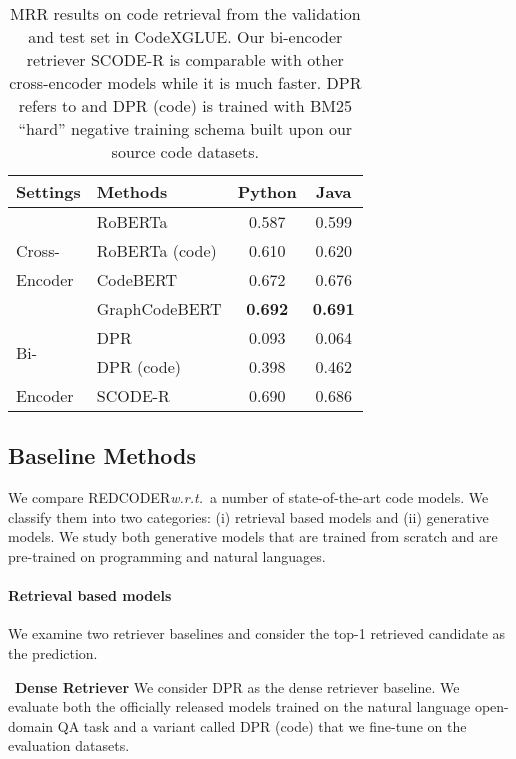 \documentclass[11pt]{article}
\newcommand{\tool}{{REDCODER}\xspace}
\newcommand{\coder}{SCODE-R\xspace}
\newcommand{\wrt}{\textit{w.r.t.}~}
\begin{document}
 \begin{table}[t]
\centering
\begin{tabular}{l|l|c|c}
\hline
Settings & Methods & Python & Java \\
\hline
 & RoBERTa & 0.587	& 0.599 \\
Cross- & RoBERTa (code) & 0.610 & 0.620 \\
Encoder & CodeBERT & 	0.672 & 	0.676 \\
& GraphCodeBERT & {\bf 0.692} & {\bf 0.691} \\
\hline
\multirow{2}{*}{Bi-} & DPR & 0.093 & 0.064 \\
& DPR (code) & 0.398 & 0.462 \\
\multirow{-2}{*}{Encoder}& \coder & 0.690 & 0.686\\
\hline
\end{tabular}
\caption{
MRR results on code retrieval from the validation and test set in CodeXGLUE. Our bi-encoder retriever \coder is comparable with other cross-encoder models while it is much faster. DPR refers to \citet{karpukhin-etal-2020-dense} and DPR (code) is trained with BM25 ``hard'' negative training schema built upon our source code datasets.
}
\label{table:code_mrr}
\vspace{-2mm}
\end{table}


 


\subsection{Baseline Methods}
We compare \tool \wrt a number of  state-of-the-art code models. We classify them into two categories: (i) retrieval based models and (ii) generative models. 
We study both generative models that are trained from scratch and are pre-trained on programming and natural languages.




\paragraph{Retrieval based models}
We examine two retriever baselines and consider the top-1 retrieved candidate as the prediction.


\noindent~\textbf{Dense Retriever\hspace{0.5em}} 
We consider DPR as the dense retriever baseline. 
We evaluate both the officially released models trained on the natural language open-domain QA task and a variant called DPR (code) that we fine-tune on the evaluation datasets.
\end{document}
